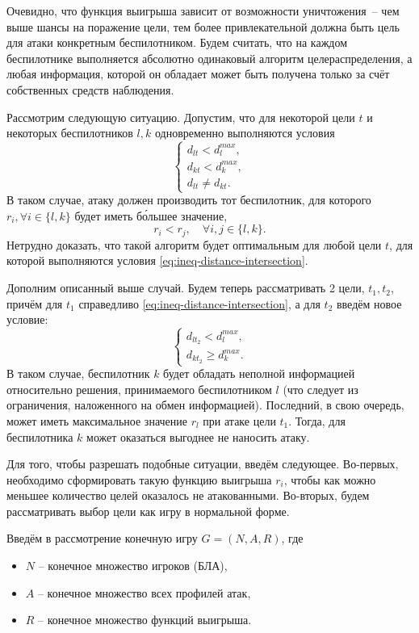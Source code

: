 Очевидно, что функция выигрыша зависит от возможности уничтожения~-- чем выше шансы на поражение цели, тем более привлекательной должна быть цель для атаки конкретным беспилотником.
Будем считать, что на каждом беспилотнике выполняется абсолютно одинаковый алгоритм целераспределения, а любая информация, которой он обладает может быть получена только за счёт собственных средств наблюдения.

Рассмотрим следующую ситуацию. 
Допустим, что для некоторой цели $ t $ и некоторых беспилотников $ l, k $ одновременно выполняются условия
\begin{equation} \label{eq:ineq-distance-intersection}
    \begin{cases}
        d_{lt} < d_{l}^{max}, \\
        d_{kt} < d_{k}^{max}, \\
        d_{lt} \ne d_{kt}.
    \end{cases}
\end{equation}
В таком случае, атаку должен производить тот беспилотник, для которого $ r_i, \forall i \in \{l, k\} $ будет иметь б\'{о}льшее значение,  
\begin{equation}
    r_i < r_j, \quad
        \forall i, j \in \{l, k\} .
\end{equation}
Нетрудно доказать, что такой алгоритм будет оптимальным для любой цели $ t $, для которой выполняются условия \eqref{eq:ineq-distance-intersection}.

Дополним описанный выше случай. 
Будем теперь рассматривать 2 цели, $ t_1, t_2 $, причём для $ t_1 $ справедливо \eqref{eq:ineq-distance-intersection}, а для $ t_2 $ введём новое условие:
\begin{equation}
    \begin{cases}
        d_{lt_2} < d_{l}^{max} , \\
        d_{kt_2} \ge d_{k}^{max} .
    \end{cases}
\end{equation}
В таком случае, беспилотник $ k $ будет обладать неполной информацией относительно решения, принимаемого беспилотником $ l $ (что следует из ограничения, наложенного на обмен информацией).
Последний, в свою очередь, может иметь максимальное значение $ r_l $ при атаке цели $ t_1 $.
Тогда, для беспилотника $ k $ может оказаться выгоднее не наносить атаку.

Для того, чтобы разрешать подобные ситуации, введём следующее. 
Во-первых, необходимо сформировать такую функцию выигрыша $ r_i $, чтобы как можно меньшее количество целей оказалось не атакованными.
Во-вторых, будем рассматривать выбор цели как игру в нормальной форме.

Введём в рассмотрение конечную игру $ G = (N, A, R) $, где
\begin{itemize}
    \item $ N $ -- конечное множество игроков (БЛА),
    \item $ A $ -- конечное множество всех профилей атак,
    \item $ R $ -- конечное множество функций выигрыша.
\end{itemize}